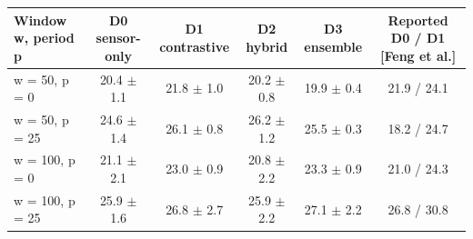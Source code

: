 \begin{tabular}{lccccc}
\toprule
\textbf{Window w, period p} & \textbf{D0 sensor-only} & \textbf{D1 contrastive} & \textbf{D2 hybrid} & \textbf{D3 ensemble} & \textbf{Reported D0 / D1 [Feng et al.]} \\
\midrule
w = 50, p = 0 & 20.4 $\pm$ 1.1 & 21.8 $\pm$ 1.0 & 20.2 $\pm$ 0.8 & 19.9 $\pm$ 0.4 & 21.9 / 24.1 \\
w = 50, p = 25 & 24.6 $\pm$ 1.4 & 26.1 $\pm$ 0.8 & 26.2 $\pm$ 1.2 & 25.5 $\pm$ 0.3 & 18.2 / 24.7 \\
w = 100, p = 0 & 21.1 $\pm$ 2.1 & 23.0 $\pm$ 0.9 & 20.8 $\pm$ 2.2 & 23.3 $\pm$ 0.9 & 21.0 / 24.3 \\
w = 100, p = 25 & 25.9 $\pm$ 1.6 & 26.8 $\pm$ 2.7 & 25.9 $\pm$ 2.2 & 27.1 $\pm$ 2.2 & 26.8 / 30.8 \\
\bottomrule
\end{tabular}
